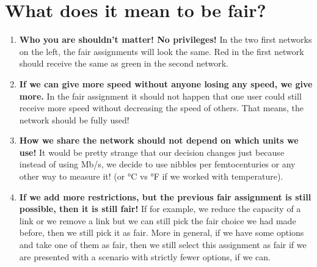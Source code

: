 \documentclass[pageborders]{zibposter}
\newcommand{\enLight}[1]{{\color{gray!40}#1}}
\begin{document}
{\begin{minipage}[c]{0.5\linewidth}
{          \section*{What does it mean to be fair?}
          \vspace*{-0.7cm}
          \begin{enumerate}
              \item[\circled{$1$}] \textbf{Who you are shouldn't matter! No privileges!} In the two first networks on the left, the fair assignments will look the same. Red in the first network should receive the same as green in the second network.
              \item[\circled{$2$}] \textbf{If we can give more speed without anyone losing any speed, we give more.} In the fair assignment it should not happen that one user could still receive more speed without decreasing the speed of others. That means, the network should be fully used!
              \item[\circled{$3$}] \textbf{How we share the network should not depend on which units we use!} It would be pretty strange that our decision changes just because instead of using Mb/s, we decide to use nibbles per femtocenturies or any other way to measure it! (or °C vs °F if we worked with temperature).
              \item[\circled{$4$}] \textbf{If we add more restrictions, but the previous fair assignment is still possible, then it is still fair!} If for example, we reduce the capacity of a link or we remove a link but we can still pick the fair choice we had made before, then we still pick it as fair. More in general, if we have some options and take one of them as fair, then we still select this assignment as fair if we are presented with a scenario with strictly fewer options, if we can.
          \end{enumerate}
          }
      \end{minipage}

    }



    \block{Verweise | \enLight{References}}{
      \nocite{*}
      
      
 		}
	
\end{document}
